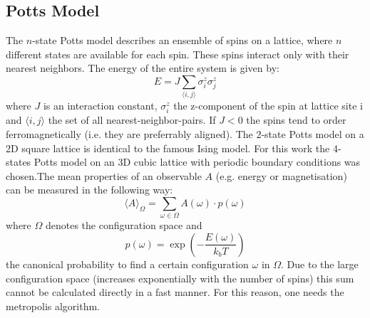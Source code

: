 \documentclass[letterpaper]{article}
\begin{document}
\subsection{Potts Model}
The $n$-state Potts model describes an ensemble of spins on a lattice, where $n$ different
states are available for each spin. These spins interact only with
their nearest neighbors. The energy of the entire system is given
by:
\[
E=J\sum_{\langle i,j \rangle}\sigma_{i}^{z}\sigma_{j}^{z}
\]
where $J$ is an interaction constant, $\sigma_{i}^{z}$ the z-component of the
spin at lattice site i and $\langle i,j \rangle$ the set of all nearest-neighbor-pairs.
If $J<0$ the spins tend to order ferromagnetically (i.e. they are preferrably aligned). The $2$-state Potts model on a 2D square lattice is identical to the famous Ising
model. For this work the 4-states Potts model on an 3D cubic lattice
with periodic boundary conditions was chosen.\newline The mean properties of an observable $A$
(e.g. energy or magnetisation) can be measured in the following way:
\[
\langle A\rangle_\Omega=\sum_{\omega\in\Omega}A(\omega)\cdot p(\omega)
\]
where $\Omega$ denotes the configuration space and \[p(\omega)=\exp{\left(-\frac{E(\omega)}{k_{b}T}\right)}\]
the canonical probability to find a certain configuration $\omega$
in $\Omega$. 
Due to the large configuration space (increases exponentially with
the number of spins) this sum cannot be calculated directly in a fast
manner. For this reason, one needs the metropolis algorithm.
\end{document}

